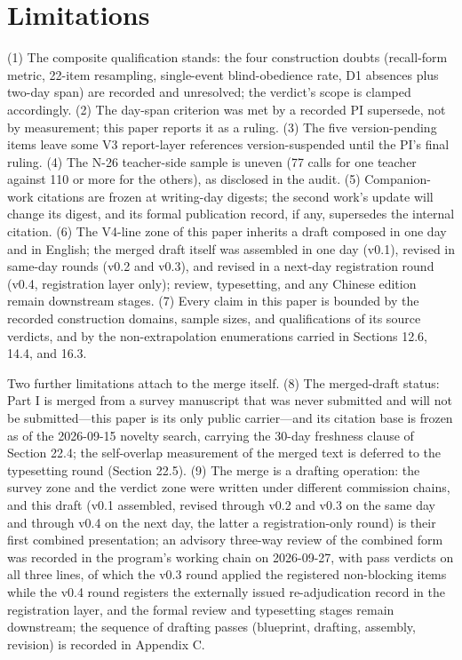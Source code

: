 \documentclass[11pt]{article}
\begin{document}
\section{Limitations}
\label{sec:21}
\noindent (1) The composite qualification stands: the four construction doubts (recall-form metric, 22-item resampling, single-event blind-obedience rate, D1 absences plus two-day span) are recorded and unresolved; the verdict's scope is clamped accordingly. (2) The day-span criterion was met by a recorded PI supersede, not by measurement; this paper reports it as a ruling. (3) The five version-pending items leave some V3 report-layer references version-suspended until the PI's final ruling. (4) The N-26 teacher-side sample is uneven (77 calls for one teacher against 110 or more for the others), as disclosed in the audit. (5) Companion-work citations are frozen at writing-day digests; the second work's update will change its digest, and its formal publication record, if any, supersedes the internal citation. (6) The V4-line zone of this paper inherits a draft composed in one day and in English; the merged draft itself was assembled in one day (v0.1), revised in same-day rounds (v0.2 and v0.3), and revised in a next-day registration round (v0.4, registration layer only); review, typesetting, and any Chinese edition remain downstream stages. (7) Every claim in this paper is bounded by the recorded construction domains, sample sizes, and qualifications of its source verdicts, and by the non-extrapolation enumerations carried in Sections 12.6, 14.4, and 16.3.\par
\noindent Two further limitations attach to the merge itself. (8) The merged-draft status: Part I is merged from a survey manuscript that was never submitted and will not be submitted—this paper is its only public carrier—and its citation base is frozen as of the 2026-09-15 novelty search, carrying the 30-day freshness clause of Section 22.4; the self-overlap measurement of the merged text is deferred to the typesetting round (Section 22.5). (9) The merge is a drafting operation: the survey zone and the verdict zone were written under different commission chains, and this draft (v0.1 assembled, revised through v0.2 and v0.3 on the same day and through v0.4 on the next day, the latter a registration-only round) is their first combined presentation; an advisory three-way review of the combined form was recorded in the program's working chain on 2026-09-27, with pass verdicts on all three lines, of which the v0.3 round applied the registered non-blocking items while the v0.4 round registers the externally issued re-adjudication record in the registration layer, and the formal review and typesetting stages remain downstream; the sequence of drafting passes (blueprint, drafting, assembly, revision) is recorded in Appendix C.\par
\end{document}
